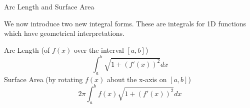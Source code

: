 \documentclass{beamer}
\begin{document}
\begin{frame}{Arc Length and Surface Area}

We now introduce two new integral forms. These are integrals for 1D functions which have geometrical interpretations. 

    Arc Length (of $f(x)$ over the interval $[a, b]$)
    \[
        \int_a^b \sqrt{1 + (f'(x))^2}dx
    \]
    Surface Area (by rotating $f(x)$ about the x-axis on $[a,b]$)
    \[
        2\pi\int_a^b f(x)\sqrt{1 + (f'(x))^2}dx
    \]

\end{frame}
\end{document}
